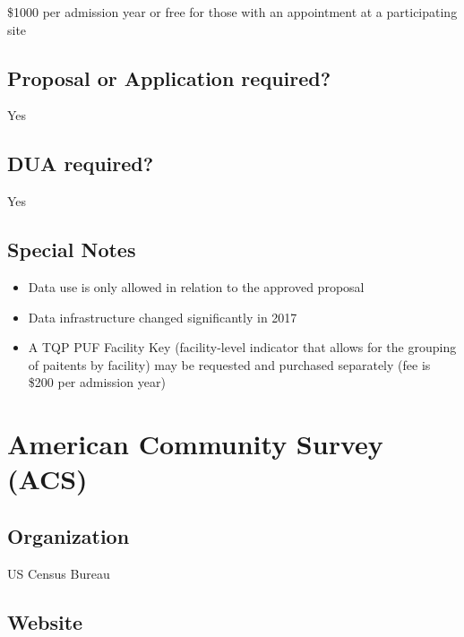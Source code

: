 \documentclass[
]{book}
\providecommand{\tightlist}{%
  \setlength{\itemsep}{0pt}\setlength{\parskip}{0pt}}
\begin{document}
\$1000 per admission year or free for those with an appointment at a participating site

\hypertarget{proposal-or-application-required-3}{%
\section{Proposal or Application required?}\label{proposal-or-application-required-3}}

Yes

\hypertarget{dua-required-3}{%
\section{DUA required?}\label{dua-required-3}}

Yes

\hypertarget{special-notes-3}{%
\section{Special Notes}\label{special-notes-3}}

\begin{itemize}
\tightlist
\item
  Data use is only allowed in relation to the approved proposal
\item
  Data infrastructure changed significantly in 2017
\item
  A TQP PUF Facility Key (facility-level indicator that allows for the grouping of paitents by facility) may be requested and purchased separately (fee is \$200 per admission year)
\end{itemize}

\mainmatter

\hypertarget{american-community-survey-acs}{%
\chapter{American Community Survey (ACS)}\label{american-community-survey-acs}}

\hypertarget{organization-4}{%
\section{Organization}\label{organization-4}}

US Census Bureau

\hypertarget{website-4}{%
\section{Website}\label{website-4}}
\end{document}
